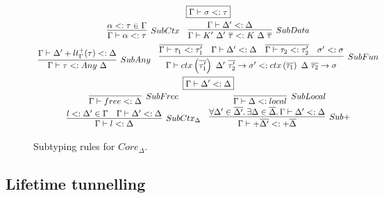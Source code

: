 \documentclass[acmsmall,review,screen]{acmart}
\newcommand{\mathframebox}[1]{\framebox{$\displaystyle #1$}}
\newcommand{\ap}{~}
\newcommand{\ctx}[1]{ctx\left(#1\right)~}
\begin{document}
\begin{figure}
    \begin{gather*}
        \mathframebox{\Gamma\vdash \sigma <: \tau} \\
        \begin{array}{cc}
            \infer[SubCtx]{\Gamma\vdash \alpha <: \tau}{\alpha <: \tau \in \Gamma} &
            \infer[SubData]{
                \Gamma\vdash K'\ap\Delta'\ap\overline{\tau} <: K\ap\Delta\ap\overline{\tau}
            }{
                \Gamma\vdash\Delta' <: \Delta
            }
        \end{array} \\
        \begin{array}{cc}
            \infer[SubAny]{
                \Gamma\vdash \tau <: Any\ap\Delta
            }{
                \Gamma\vdash \Delta'+lt_\Gamma^+(\tau) <: \Delta
            } &
            \infer[SubFun]{
                \Gamma\vdash\ctx{\overline{\tau_1'}}\Delta'~\overline{\tau_2'}\to\sigma' <: \ctx{\overline{\tau_1}}\Delta~\overline{\tau_2}\to\sigma
            }{
                \overline{\Gamma\vdash\tau_1 <: \tau_1'} &
                \Gamma\vdash\Delta' <: \Delta &
                \overline{\Gamma\vdash\tau_2 <: \tau_2'} &
                \sigma' <: \sigma
            }
        \end{array} \\
        \mathframebox{\Gamma\vdash\Delta' <: \Delta} \\
        \begin{array}{cc}
            \infer[SubFree]{\Gamma\vdash free <: \Delta}{} &
            \infer[SubLocal]{\Gamma\vdash\Delta <: local}{} \\
            \infer[SubCtx_\Delta]{
                \Gamma\vdash l <: \Delta
            }{
                l <: \Delta' \in \Gamma & \Gamma\vdash\Delta' <: \Delta
            } &
            \infer[Sub+]{
                \Gamma\vdash+\overline{\Delta'} <: +\overline{\Delta}
            }{
                \forall\Delta'\in\overline{\Delta'}\ldotp\exists\Delta\in\overline{\Delta}\ldotp \Gamma\vdash\Delta' <: \Delta
            }
        \end{array}
    \end{gather*}
    \caption{Subtyping rules for $Core_{\Delta}$.}
    \label{fig:core-delta-subtyping}
\end{figure}


\subsection{Lifetime tunnelling}
\end{document}
